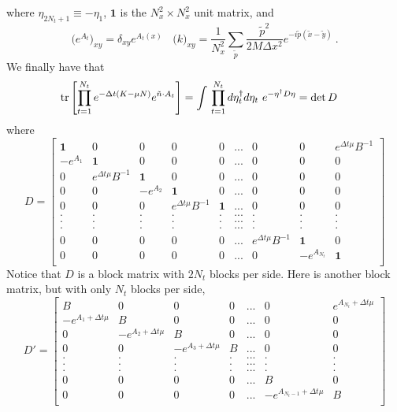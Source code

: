 where $\eta_{2 N_t + 1} \equiv - \eta_1$, $\mathbf{1}$ is the $N_x^2 \times N_x^2$ unit matrix, and  
\begin{equation}
\Big( e^{A_t} \Big)_{xy} = \delta_{xy} e^{A_t(x)}~~~~\big(k\big)_{xy} = \frac{1}{N_x^2} \sum_{\tilde{p}} \frac{\tilde{p}^2}{2 M \Delta x^2} e^{-i \tilde{p} (\tilde{x}-\tilde{y})}~.
\end{equation}
We finally have that 
\begin{align*}
& \text{tr}\left[\prod_{t=1}^{N_t} e^{-\Delta t(K - \mu N)}  e^{ \tilde{n}\cdot A_t} \right]  = \int{} \prod_{t=1}^{N_t} d \eta^{\dagger}_t d\eta_t ~ e^{- \eta^{\dagger} D \eta} = \text{det} \, D
\end{align*}
where 
\begin{equation}
D = \begin{bmatrix} 
\mathbf{1} & 0 & 0 & 0 & 0 & ... & 0 & 0 & e^{\Delta t \mu} B^{-1} \\
-e^{A_1} & \mathbf{1} & 0 & 0 & 0 & ... & 0 & 0 & 0 \\
0 & e^{\Delta t \mu} B^{-1} & \mathbf{1} & 0 & 0 & ... & 0 & 0 & 0 \\
0 & 0 & -e^{A_2} & \mathbf{1} & 0 & ... & 0 & 0 & 0 \\
0 & 0 & 0 & e^{\Delta t \mu} B^{-1} & \mathbf{1} & ... & 0 & 0 & 0 \\
. & . & . & . & . & ... & . & . & . \\
. & . & . & . & . & ... & . & . & . \\
. & . & . & . & . & ... & . & . & . \\
0 & 0 & 0 & 0 & 0 & ... & e^{\Delta t \mu} B^{-1} & \mathbf{1} & 0 \\
0 & 0 & 0 & 0 & 0 & ... & 0 & -e^{A_{N_t}} & \mathbf{1} \\
\end{bmatrix}
\end{equation}
Notice that $D$ is a block matrix with $2N_t$ blocks per side. Here is another block matrix, but with only $N_t$ blocks per side,
\begin{equation}
D' = \begin{bmatrix}
B & 0 & 0 & 0 & ... & 0 & e^{A_{N_t}+ \Delta t \mu} \\
-e^{A_1+ \Delta t \mu} & B & 0 & 0 & ... & 0 & 0 \\
0 & -e^{A_2+ \Delta t \mu} & B & 0 & ... & 0 & 0 \\
0 & 0 & -e^{A_3+ \Delta t \mu} & B & ... & 0 & 0 \\
. & . & . & . & ... & . & . \\
. & . & . & . & ... & . & . \\
. & . & . & . & ... & . & . \\
0 & 0 & 0 & 0 & ... & B & 0 \\
0 & 0 & 0 & 0 & ... & -e^{A_{N_t-1}+ \Delta t \mu} & B \\
\end{bmatrix}
\end{equation} 
